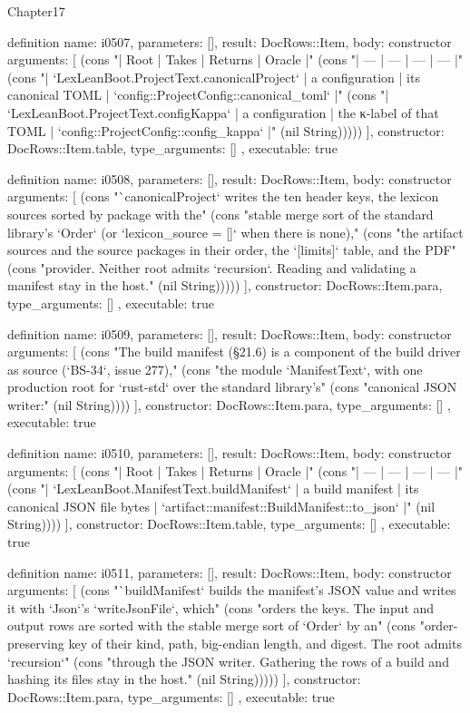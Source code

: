 \begin{lexlean}{Chapter17}
\begin{semanticmodule}
definition{
  name: i0507,
  parameters: [],
  result: DocRows::Item,
  body: constructor{
    arguments: [
      (cons "| Root | Takes | Returns | Oracle |" (cons "| --- | --- | --- | --- |" (cons "| `LexLeanBoot.ProjectText.canonicalProject` | a configuration | its canonical TOML | `config::ProjectConfig::canonical_toml` |" (cons "| `LexLeanBoot.ProjectText.configKappa` | a configuration | the κ-label of that TOML | `config::ProjectConfig::config_kappa` |" (nil String)))))
    ],
    constructor: DocRows::Item.table,
    type_arguments: []
  },
  executable: true
}

definition{
  name: i0508,
  parameters: [],
  result: DocRows::Item,
  body: constructor{
    arguments: [
      (cons "`canonicalProject` writes the ten header keys, the lexicon sources sorted by package with the" (cons "stable merge sort of the standard library's `Order` (or `lexicon_source = []` when there is none)," (cons "the artifact sources and the source packages in their order, the `[limits]` table, and the PDF" (cons "provider. Neither root admits `recursion`. Reading and validating a manifest stay in the host." (nil String)))))
    ],
    constructor: DocRows::Item.para,
    type_arguments: []
  },
  executable: true
}

definition{
  name: i0509,
  parameters: [],
  result: DocRows::Item,
  body: constructor{
    arguments: [
      (cons "The build manifest (§21.6) is a component of the build driver as source (`BS-34`, issue 277)," (cons "the module `ManifestText`, with one production root for `rust-std` over the standard library's" (cons "canonical JSON writer:" (nil String))))
    ],
    constructor: DocRows::Item.para,
    type_arguments: []
  },
  executable: true
}

definition{
  name: i0510,
  parameters: [],
  result: DocRows::Item,
  body: constructor{
    arguments: [
      (cons "| Root | Takes | Returns | Oracle |" (cons "| --- | --- | --- | --- |" (cons "| `LexLeanBoot.ManifestText.buildManifest` | a build manifest | its canonical JSON file bytes | `artifact::manifest::BuildManifest::to_json` |" (nil String))))
    ],
    constructor: DocRows::Item.table,
    type_arguments: []
  },
  executable: true
}

definition{
  name: i0511,
  parameters: [],
  result: DocRows::Item,
  body: constructor{
    arguments: [
      (cons "`buildManifest` builds the manifest's JSON value and writes it with `Json`'s `writeJsonFile`, which" (cons "orders the keys. The input and output rows are sorted with the stable merge sort of `Order` by an" (cons "order-preserving key of their kind, path, big-endian length, and digest. The root admits `recursion`" (cons "through the JSON writer. Gathering the rows of a build and hashing its files stay in the host." (nil String)))))
    ],
    constructor: DocRows::Item.para,
    type_arguments: []
  },
  executable: true
}


\end{semanticmodule}
\end{lexlean}
